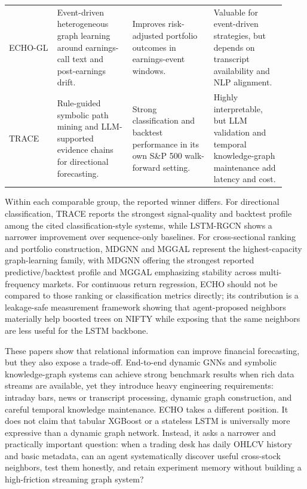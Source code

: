 \documentclass[12pt,a4paper,titlepage]{article}
\begin{document}
\begin{table}[htbp]
{\begin{tabular}{p{0.16\linewidth} p{0.25\linewidth} p{0.27\linewidth} p{0.24\linewidth}}
ECHO-GL \citep{liu2024echogl} & Event-driven heterogeneous graph learning around earnings-call text and post-earnings drift. & Improves risk-adjusted portfolio outcomes in earnings-event windows. & Valuable for event-driven strategies, but depends on transcript availability and NLP alignment. \\
TRACE \citep{chen2026trace} & Rule-guided symbolic path mining and LLM-supported evidence chains for directional forecasting. & Strong classification and backtest performance in its own S\&P 500 walk-forward setting. & Highly interpretable, but LLM validation and temporal knowledge-graph maintenance add latency and cost. \\
\bottomrule
\end{tabular}%
}
\end{table}

Within each comparable group, the reported winner differs. For directional classification, TRACE reports the strongest signal-quality and backtest profile among the cited classification-style systems, while LSTM-RGCN shows a narrower improvement over sequence-only baselines. For cross-sectional ranking and portfolio construction, MDGNN and MGGAL represent the highest-capacity graph-learning family, with MDGNN offering the strongest reported predictive/backtest profile and MGGAL emphasizing stability across multi-frequency markets. For continuous return regression, ECHO should not be compared to those ranking or classification metrics directly; its contribution is a leakage-safe measurement framework showing that agent-proposed neighbors materially help boosted trees on NIFTY while exposing that the same neighbors are less useful for the LSTM backbone.

These papers show that relational information can improve financial forecasting, but they also expose a trade-off. End-to-end dynamic GNNs and symbolic knowledge-graph systems can achieve strong benchmark results when rich data streams are available, yet they introduce heavy engineering requirements: intraday bars, news or transcript processing, dynamic graph construction, and careful temporal knowledge maintenance. ECHO takes a different position. It does not claim that tabular XGBoost or a stateless LSTM is universally more expressive than a dynamic graph network. Instead, it asks a narrower and practically important question: when a trading desk has daily OHLCV history and basic metadata, can an agent systematically discover useful cross-stock neighbors, test them honestly, and retain experiment memory without building a high-friction streaming graph system?
\end{document}

